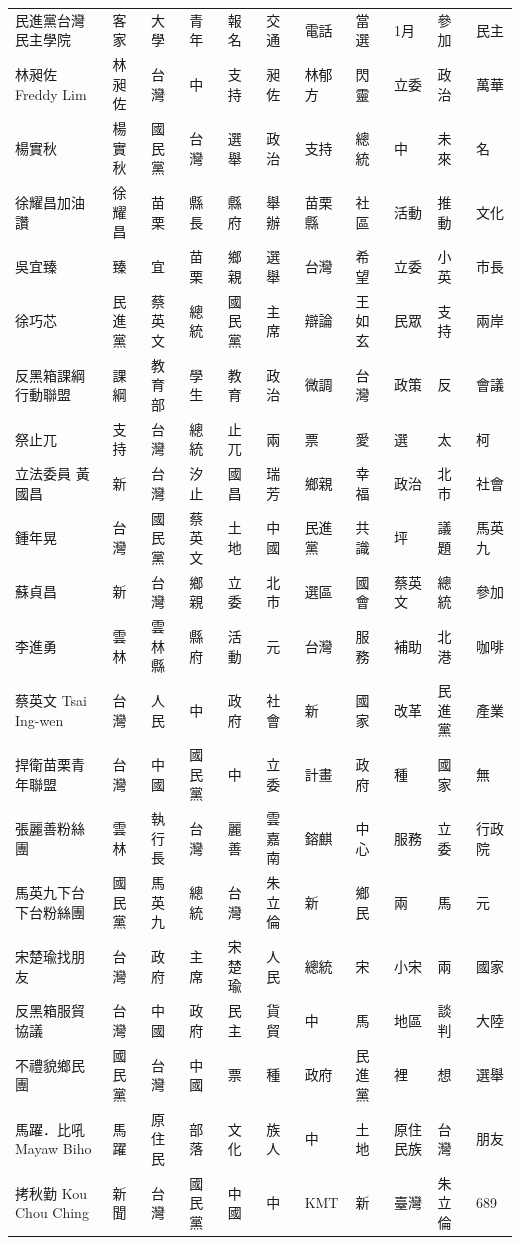 \documentclass[a4paper, 10pt, conference]{ieeeconf}       %
\begin{document}
\begin{CJK}{UTF8}{bsmi}
\begin{longtable}[c]{@{}L{2.45cm}L{1.1cm}L{1.1cm}L{1.1cm}L{1.1cm}L{1.1cm}L{1.1cm}L{1.1cm}L{1.41cm}L{1.1cm}L{1.1cm}@{}}
民進黨台灣民主學院 & 客家 & 大學 & 青年 & 報名 & 交通 & 電話 & 當選 & 1月 & 參加 & 民主 \\
林昶佐 Freddy Lim & 林昶佐 & 台灣 & 中 & 支持 & 昶佐 & 林郁方 & 閃靈 & 立委 & 政治 & 萬華 \\
楊實秋 & 楊實秋 & 國民黨 & 台灣 & 選舉 & 政治 & 支持 & 總統 & 中 & 未來 & 名 \\
徐耀昌加油讚 & 徐耀昌 & 苗栗 & 縣長 & 縣府 & 舉辦 & 苗栗縣 & 社區 & 活動 & 推動 & 文化 \\
吳宜臻 & 臻 & 宜 & 苗栗 & 鄉親 & 選舉 & 台灣 & 希望 & 立委 & 小英 & 市長 \\
徐巧芯 & 民進黨 & 蔡英文 & 總統 & 國民黨 & 主席 & 辯論 & 王如玄 & 民眾 & 支持 & 兩岸 \\
反黑箱課綱行動聯盟 & 課綱 & 教育部 & 學生 & 教育 & 政治 & 微調 & 台灣 & 政策 & 反 & 會議 \\
祭止兀 & 支持 & 台灣 & 總統 & 止兀 & 兩 & 票 & 愛 & 選 & 太 & 柯 \\
立法委員 黃國昌 & 新 & 台灣 & 汐止 & 國昌 & 瑞芳 & 鄉親 & 幸福 & 政治 & 北市 & 社會 \\
鍾年晃 & 台灣 & 國民黨 & 蔡英文 & 土地 & 中國 & 民進黨 & 共識 & 坪 & 議題 & 馬英九 \\
蘇貞昌 & 新 & 台灣 & 鄉親 & 立委 & 北市 & 選區 & 國會 & 蔡英文 & 總統 & 參加 \\
李進勇 & 雲林 & 雲林縣 & 縣府 & 活動 & 元 & 台灣 & 服務 & 補助 & 北港 & 咖啡 \\
蔡英文 Tsai Ing-wen & 台灣 & 人民 & 中 & 政府 & 社會 & 新 & 國家 & 改革 & 民進黨 & 產業 \\
捍衛苗栗青年聯盟 & 台灣 & 中國 & 國民黨 & 中 & 立委 & 計畫 & 政府 & 種 & 國家 & 無 \\
張麗善粉絲團 & 雲林 & 執行長 & 台灣 & 麗善 & 雲嘉南 & 鎔麒 & 中心 & 服務 & 立委 & 行政院 \\
馬英九下台下台粉絲團 & 國民黨 & 馬英九 & 總統 & 台灣 & 朱立倫 & 新 & 鄉民 & 兩 & 馬 & 元 \\
宋楚瑜找朋友 & 台灣 & 政府 & 主席 & 宋楚瑜 & 人民 & 總統 & 宋 & 小宋 & 兩 & 國家 \\
反黑箱服貿協議 & 台灣 & 中國 & 政府 & 民主 & 貨貿 & 中 & 馬 & 地區 & 談判 & 大陸 \\
不禮貌鄉民團 & 國民黨 & 台灣 & 中國 & 票 & 種 & 政府 & 民進黨 & 裡 & 想 & 選舉 \\
馬躍．比吼 Mayaw Biho & 馬躍 & 原住民 & 部落 & 文化 & 族人 & 中 & 土地 & 原住民族 & 台灣 & 朋友 \\
拷秋勤 Kou Chou Ching & 新聞 & 台灣 & 國民黨 & 中國 & 中 & KMT & 新 & 臺灣 & 朱立倫 & 689 \\

\end{longtable}
\end{CJK}
\end{document}
